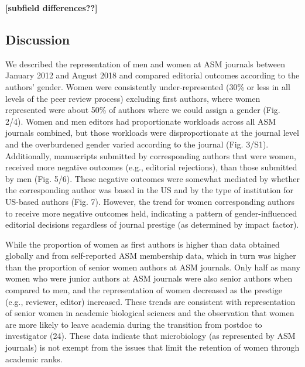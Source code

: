 \documentclass[11pt,]{article}
\begin{document}
\textbf{{[}subfield differences??{]}}

\subsection{Discussion}\label{discussion}

We described the representation of men and women at ASM journals between
January 2012 and August 2018 and compared editorial outcomes according
to the authors' gender. Women were consistently under-represented (30\%
or less in all levels of the peer review process) excluding first
authors, where women represented were about 50\% of authors where we
could assign a gender (Fig. 2/4). Women and men editors had
proportionate workloads across all ASM journals combined, but those
workloads were disproportionate at the journal level and the
overburdened gender varied according to the journal (Fig. 3/S1).
Additionally, manuscripts submitted by corresponding authors that were
women, received more negative outcomes (e.g., editorial rejections),
than those submitted by men (Fig. 5/6). These negative outcomes were
somewhat mediated by whether the corresponding author was based in the
US and by the type of institution for US-based authors (Fig. 7).
However, the trend for women corresponding authors to receive more
negative outcomes held, indicating a pattern of gender-influenced
editorial decisions regardless of journal prestige (as determined by
impact factor).

While the proportion of women as first authors is higher than data
obtained globally and from self-reported ASM membership data, which in
turn was higher than the proportion of senior women authors at ASM
journals. Only half as many women who were junior authors at ASM
journals were also senior authors when compared to men, and the
representation of women decreased as the prestige (e.g., reviewer,
editor) increased. These trends are consistent with representation of
senior women in academic biological sciences and the observation that
women are more likely to leave academia during the transition from
postdoc to investigator (24). These data indicate that microbiology (as
represented by ASM journals) is not exempt from the issues that limit
the retention of women through academic ranks.
\end{document}
